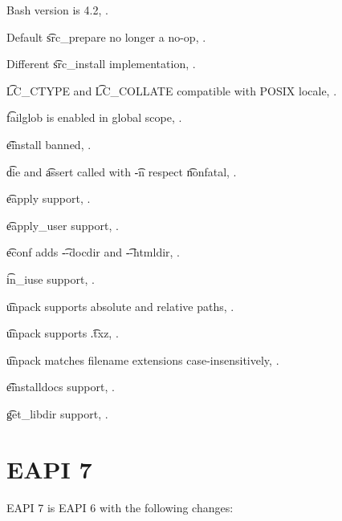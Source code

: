 \begin{compactitem}
\item Bash version is 4.2, .
\item Default \t{src_prepare} no longer a no-op, .
\item Different \t{src_install} implementation, .
\item \t{LC_CTYPE} and \t{LC_COLLATE} compatible with POSIX locale, .
\item \t{failglob} is enabled in global scope, .
\item \t{einstall} banned, .
\item \t{die} and \t{assert} called with \t{-n} respect \t{nonfatal}, .
\item \t{eapply} support, .
\item \t{eapply_user} support, .
\item \t{econf} adds \t{-{}-docdir} and \t{-{}-htmldir}, .
\item \t{in_iuse} support, .
\item \t{unpack} supports absolute and relative paths, .
\item \t{unpack} supports \t{.txz}, .
\item \t{unpack} matches filename extensions case-insensitively, .
\item \t{einstalldocs} support, .
\item \t{get_libdir} support, .
\end{compactitem}

\section{EAPI 7}

EAPI 7 is EAPI 6 with the following changes:




